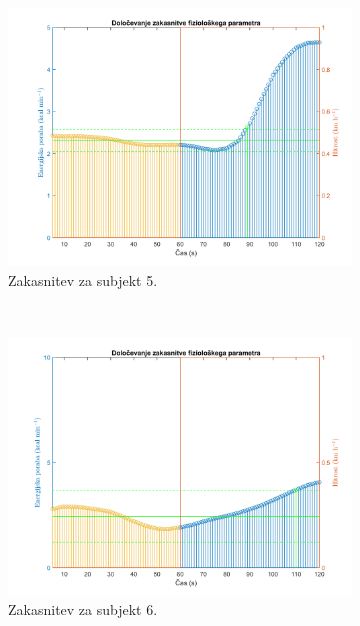 \begin{figure}[!htbp]
\begin{subfigure}[t]{0.45\columnwidth}
		\includegraphics[width=\columnwidth]{./Slike/lag-estimation-5-eem.png}
		\caption{Zakasnitev za subjekt 5.}
		\label{fig:lag-estimation-5-eem}
	\end{subfigure}
	~
	\begin{subfigure}[t]{0.45\columnwidth}
		\includegraphics[width=\columnwidth]{./Slike/lag-estimation-6-eem.png}
		\caption{Zakasnitev za subjekt 6.}
		\label{fig:lag-estimation-6-eem}
	\end{subfigure}
	\caption{}
	\label{fig:lag-estimation-stage2}
\end{figure}










